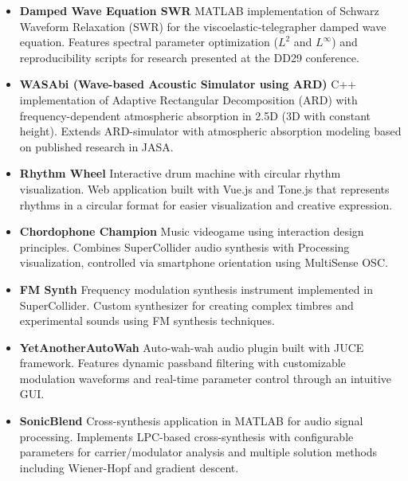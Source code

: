 \documentclass[11pt,a4paper]{article}
\begin{document}
\begin{itemize}
  \item \textbf{Damped Wave Equation SWR}
        \newline MATLAB implementation of Schwarz Waveform Relaxation (SWR) for the viscoelastic-telegrapher damped wave equation. Features spectral parameter optimization ($L^2$ and $L^\infty$) and reproducibility scripts for research presented at the DD29 conference.

  \item \textbf{WASAbi (Wave-based Acoustic Simulator using ARD)} 
        \newline C++ implementation of Adaptive Rectangular Decomposition (ARD) with frequency-dependent atmospheric absorption in 2.5D (3D with constant height). Extends ARD-simulator with atmospheric absorption modeling based on published research in JASA.
  
  \item \textbf{Rhythm Wheel}
        \newline Interactive drum machine with circular rhythm visualization. Web application built with Vue.js and Tone.js that represents rhythms in a circular format for easier visualization and creative expression.
  
  \item \textbf{Chordophone Champion}
        \newline Music videogame using interaction design principles. Combines SuperCollider audio synthesis with Processing visualization, controlled via smartphone orientation using MultiSense OSC.
  
  \item \textbf{FM Synth}
        \newline Frequency modulation synthesis instrument implemented in SuperCollider. Custom synthesizer for creating complex timbres and experimental sounds using FM synthesis techniques.
  
  \item \textbf{YetAnotherAutoWah}
        \newline Auto-wah-wah audio plugin built with JUCE framework. Features dynamic passband filtering with customizable modulation waveforms and real-time parameter control through an intuitive GUI.
  
  \item \textbf{SonicBlend}
        \newline Cross-synthesis application in MATLAB for audio signal processing. Implements LPC-based cross-synthesis with configurable parameters for carrier/modulator analysis and multiple solution methods including Wiener-Hopf and gradient descent.
\end{itemize}
\end{document}
